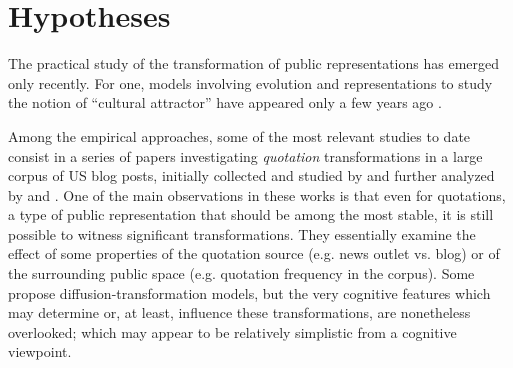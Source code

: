 \section{Hypotheses} %
\label{sec:related}

 
The practical study of the transformation of public representations has emerged only recently.
For one, models involving evolution and representations to study the notion of ``cultural attractor'' have appeared only a few years ago \citep{Claidiere07}.
 
Among the empirical approaches, some of the most relevant studies to date consist in a series of papers investigating \emph{quotation} transformations in a large corpus of US blog posts, initially collected and studied by \citet{Leskovec09} and further analyzed by \citet{Simmons11} and \citet{omod-mult}.
One of the main observations in these works is that even for quotations, a type of public representation that should be among the most stable, it is still possible to witness significant transformations. They essentially examine the effect of some properties of the quotation source (\hbox{e.g.} news outlet {vs.} blog) or of the surrounding public space (\hbox{e.g.} quotation frequency in the corpus). Some propose diffusion-transformation models, but the very cognitive features which may determine or, at least, influence these transformations, are nonetheless overlooked; which may appear to be relatively simplistic from a cognitive viewpoint.


